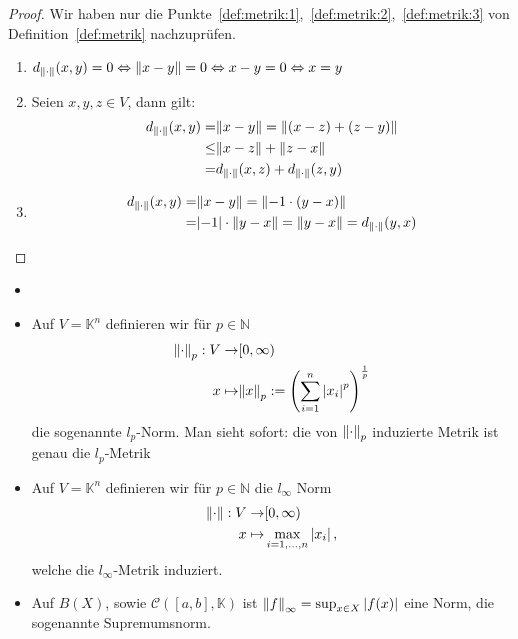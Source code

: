 \begin{proof}
	Wir haben nur die Punkte~\ref{def:metrik:1},~\ref{def:metrik:2},~\ref{def:metrik:3} von Definition~\ref{def:metrik} nachzuprüfen.
	\begin{enumerate}
		\item $
			d_{\norm{\cdot}}(x,y) = 0 \Leftrightarrow \norm{x-y} = 0		
			\Leftrightarrow  x-y = 0 
			\Leftrightarrow x = y
		$
		\item Seien $x,y,z \in V$, dann gilt:
		\begin{align*}
			d_{\norm{\cdot}}(x,y) = & \norm{x-y} = \norm{(x-z)+(z-y)} \\
			\leq & \norm{x-z} + \norm{z-x} \\
			= & d_{\norm{\cdot}}(x,z) + d_{\norm{\cdot}}(z,y)	
		\end{align*}
		\item 
		\begin{align*}
			d_{\norm{\cdot}}(x,y) = & \norm{x-y} = \norm{-1 \cdot (y-x)} \\
			=& \abs{-1} \cdot \norm{y-x} = \norm{y-x} = d_{\norm{\cdot}}(y,x)
		\end{align*}
	\end{enumerate}
\end{proof}

\begin{Beispiel}{
	\begin{itemize}
		\item[]
		\item Auf $V = \mathbb{K}^n$ definieren wir für $p \in \mathbb{N}$
		\begin{align*}
			\norm{\cdot}_p : V \to & [0, \infty) \\
				x \mapsto &\norm{x}_p := \left( \sum_{i=1}^n \abs{x_i}^p \right)^{\frac{1}{p}}
		\end{align*}
		die sogenannte $l_p$-Norm.
		Man sieht sofort: die von $\norm{\cdot}_p$ induzierte Metrik ist genau die 
		$l_p$-Metrik
		\item Auf $V = \mathbb{K}^n$ definieren wir für $p \in \mathbb{N}$ die $l_\infty$ Norm
		\begin{align*}
			\norm{\cdot}: V \to & [0, \infty)  \\
			x \mapsto & \max_{i = 1, \hdots, n} \abs{x_i}\,,
		\end{align*}
		welche die $l_\infty$-Metrik induziert.
		\item Auf $B(X)$, sowie $\mathcal{C}([a,b], \mathbb{K})$ ist
		$\norm{f}_\infty = \sup_{x \in X} \abs{f(x)}$ eine Norm, die sogenannte 
		Supremumsnorm.
	\end{itemize}
}\end{Beispiel}

